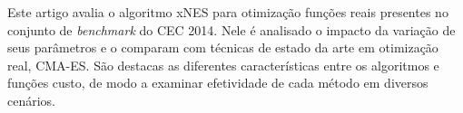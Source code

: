 Este artigo avalia o algoritmo xNES para otimização funções reais presentes no conjunto de \textit{benchmark} do CEC 2014.
Nele é analisado o impacto da variação de seus parâmetros e o comparam com técnicas de estado da arte em otimização real, CMA-ES.
São destacas as diferentes características entre os algoritmos e funções custo, de modo a examinar efetividade de cada método em diversos cenários.

